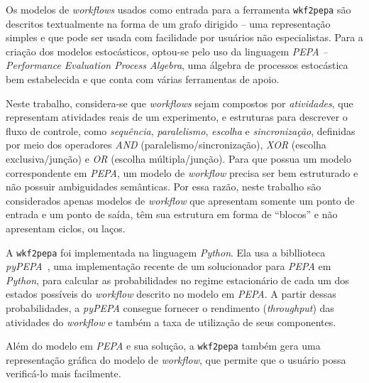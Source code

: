 \documentclass[a4paper,10pt]{article}
\begin{document}
        Os modelos de \emph{workflows} usados como entrada para a ferramenta \texttt{wkf2pepa} são descritos textualmente na forma de um grafo dirigido -- uma representação simples e que pode ser usada com facilidade por usuários não especialistas.
        Para a criação dos modelos estocásticos, optou-se pelo uso da linguagem \emph{PEPA -- Performance Evaluation Process Algebra}, uma álgebra de processos estocástica bem estabelecida e que conta com várias ferramentas de apoio.

         Neste trabalho, considera-se que \emph{workflows} sejam compostos por \emph{atividades}, que representam atividades reais de um experimento, e estruturas para descrever o fluxo de controle, como \emph{sequência}, \emph{paralelismo}, \emph{escolha} e \emph{sincronização}, definidas por meio dos operadores \emph{AND} (paralelismo/sincronização), \emph{XOR} (escolha exclusiva/junção) e \emph{OR} (escolha múltipla/junção).
        Para que possua um modelo correspondente em \emph{PEPA}, um modelo de \emph{workflow} precisa ser bem estruturado e não possuir ambiguidades semânticas. Por essa razão, neste trabalho são considerados apenas modelos de \emph{workflow} que apresentam somente um ponto de entrada e um ponto de saída, têm sua estrutura em forma de ``blocos'' e não apresentam ciclos, ou laços.

        A \texttt{wkf2pepa} foi implementada na linguagem \emph{Python}. Ela usa a bibllioteca \emph{pyPEPA}~\cite{web:pypepa}, uma implementação recente de um solucionador para \emph{PEPA} em \emph{Python}, para calcular as probabilidades no regime estacion\'ario de cada um dos estados poss\'iveis do \emph{workflow} descrito no modelo em \emph{PEPA}. A partir dessas probabilidades, a \emph{pyPEPA} consegue fornecer o rendimento (\emph{throughput}) das atividades do \emph{workflow} e também a taxa de utilizaç\~ao de seus componentes.

        Além do modelo em \emph{PEPA} e sua solução, a \texttt{wkf2pepa} também gera uma representação gráfica do modelo de \emph{workflow}, que permite que o usuário possa verificá-lo mais facilmente.
\end{document}
